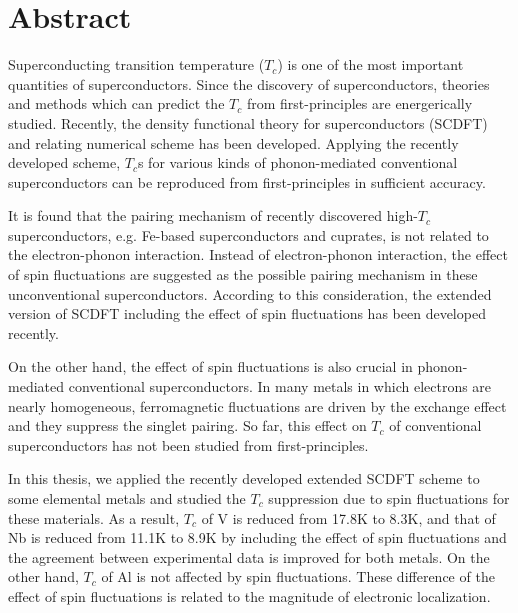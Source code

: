 


\chapter*{Abstract}

Superconducting transition temperature ($T_{c}$) is one of the most important quantities of superconductors. 
Since the discovery of superconductors, theories and methods which can predict the $T_c$ from
first-principles are energerically studied. Recently, the density functional theory for 
superconductors (SCDFT) and relating numerical scheme has been developed. Applying the recently 
developed scheme, $T_c$s for various kinds of phonon-mediated conventional superconductors can be 
reproduced from first-principles in sufficient accuracy.

It is found that the pairing mechanism of recently discovered high-$T_c$ 
superconductors, e.g. Fe-based superconductors and cuprates, is not related to the electron-phonon 
interaction. Instead of electron-phonon interaction, the effect of spin fluctuations are suggested
as the possible pairing mechanism in these unconventional superconductors. According to this 
consideration, the extended version of SCDFT including the effect of spin fluctuations has been 
developed recently.

On the other hand, the effect of spin fluctuations is also crucial in phonon-mediated conventional
superconductors. In many metals in which electrons are nearly homogeneous, ferromagnetic fluctuations
are driven by the exchange effect and they suppress the singlet pairing. So far, this effect on 
$T_c$ of conventional superconductors has not been studied from first-principles.

In this thesis, we applied the recently developed extended SCDFT scheme to some elemental metals 
and studied the $T_c$ suppression due to spin fluctuations for these materials. As a result,
$T_c$ of V is reduced from 17.8K to 8.3K, and that of Nb is reduced from 11.1K to 8.9K by including
the effect of spin fluctuations and the agreement between experimental data is improved for both 
metals. On the other hand, $T_c$ of Al is not affected by spin fluctuations. These difference of
the effect of spin fluctuations is related to the magnitude of electronic localization.




\clearpage


